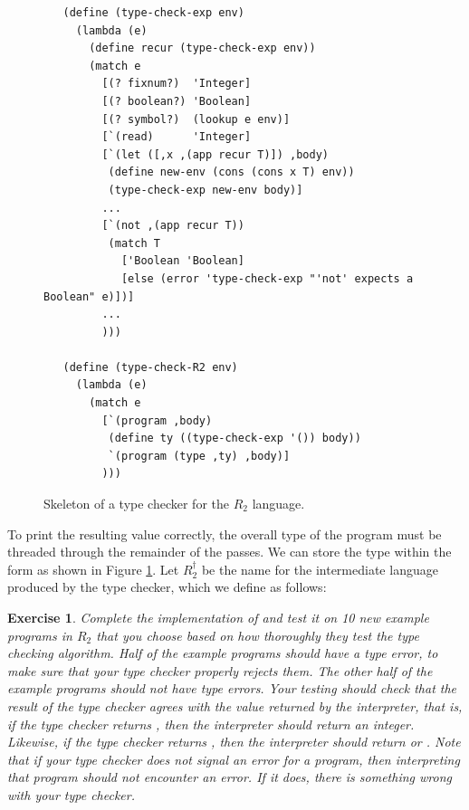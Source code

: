 \documentclass[11pt]{book}
\newtheorem{exercise}[theorem]{Exercise}
\begin{document}
\begin{figure}[tbp]
\begin{lstlisting}
   (define (type-check-exp env)
     (lambda (e)
       (define recur (type-check-exp env))
       (match e
         [(? fixnum?)  'Integer]
         [(? boolean?) 'Boolean]
         [(? symbol?)  (lookup e env)]
         [`(read)      'Integer]
         [`(let ([,x ,(app recur T)]) ,body)
          (define new-env (cons (cons x T) env))
          (type-check-exp new-env body)]
         ...
         [`(not ,(app recur T))
          (match T
            ['Boolean 'Boolean]
            [else (error 'type-check-exp "'not' expects a Boolean" e)])]
         ...
         )))

   (define (type-check-R2 env)
     (lambda (e)
       (match e
         [`(program ,body)
          (define ty ((type-check-exp '()) body))
          `(program (type ,ty) ,body)]
         )))
\end{lstlisting}
\caption{Skeleton of a type checker for the $R_2$ language.}
\label{fig:type-check-R2}
\end{figure}

To print the resulting value correctly, the overall type of the
program must be threaded through the remainder of the passes. We can
store the type within the  form as shown in Figure
\ref{fig:type-check-R2}. Let $R^\dagger_2$ be the name for the
intermediate language produced by the type checker, which we define as
follows: \\[1ex]

\begin{exercise}\normalfont
Complete the implementation of  and test it on 10
new example programs in $R_2$ that you choose based on how thoroughly
they test the type checking algorithm. Half of the example programs
should have a type error, to make sure that your type checker properly
rejects them. The other half of the example programs should not have
type errors. Your testing should check that the result of the type
checker agrees with the value returned by the interpreter, that is, if
the type checker returns , then the interpreter should
return an integer. Likewise, if the type checker returns
, then the interpreter should return  or
. Note that if your type checker does not signal an error
for a program, then interpreting that program should not encounter an
error.  If it does, there is something wrong with your type checker.
\end{exercise}
\end{document}
